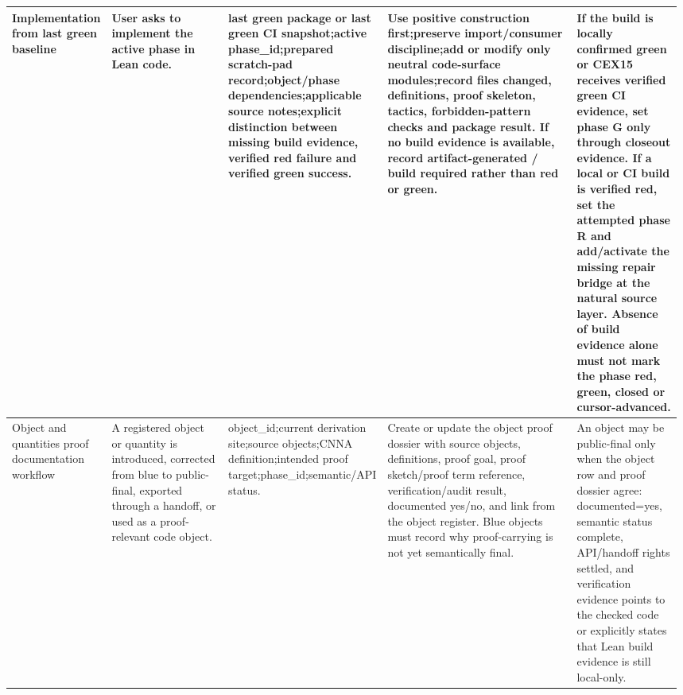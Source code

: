 \begin{longtable}{L{0.14\linewidth} L{0.19\linewidth} L{0.18\linewidth} L{0.31\linewidth} L{0.16\linewidth}}
\hline
\addlinespace[0.24em]
Implementation from last green baseline & User asks to implement the active phase in Lean code. & last green package or last green CI snapshot;\newline active phase\_id;\newline prepared scratch-pad record;\newline object/\allowbreak{}phase dependencies;\newline applicable source notes;\newline explicit distinction between missing build evidence, verified red failure and verified green success. & Use positive construction first;\newline preserve import/\allowbreak{}consumer discipline;\newline add or modify only neutral code-surface modules;\newline record files changed, definitions, proof skeleton, tactics, forbidden-pattern checks and package result. If no build evidence is available, record artifact-generated /\allowbreak{} build required rather than red or green. & If the build is locally confirmed green or CEX15 receives verified green CI evidence, set phase G only through closeout evidence. If a local or CI build is verified red, set the attempted phase R and add/\allowbreak{}activate the missing repair bridge at the natural source layer. Absence of build evidence alone must not mark the phase red, green, closed or cursor-advanced.\\
\hline
\addlinespace[0.24em]
Object and quantities proof documentation workflow & A registered object or quantity is introduced, corrected from blue to public-final, exported through a handoff, or used as a proof-relevant code object. & object\_id;\newline current derivation site;\newline source objects;\newline CNNA definition;\newline intended proof target;\newline phase\_id;\newline semantic/\allowbreak{}API status. & Create or update the object proof dossier with source objects, definitions, proof goal, proof sketch/\allowbreak{}proof term reference, verification/\allowbreak{}audit result, documented yes/\allowbreak{}no, and link from the object register. Blue objects must record why proof-carrying is not yet semantically final. & An object may be public-final only when the object row and proof dossier agree: documented=yes, semantic status complete, API/\allowbreak{}handoff rights settled, and verification evidence points to the checked code or explicitly states that Lean build evidence is still local-only.\\

\end{longtable}
